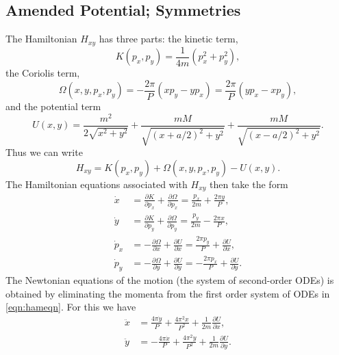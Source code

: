 \documentclass[12pt]{article}
\begin{document}
\subsection{Amended Potential; Symmetries}
The Hamiltonian $H_{xy}$ has three parts: the kinetic term,
\[ K(p_x,p_y) = \frac{1}{4m}\left( p_x^2 + p_y^2\right),\]
the Coriolis term,
\[ \Omega(x,y,p_x,p_y) = - \frac{2\pi}{P}(xp_y - yp_x) = \frac{2\pi}{P}(yp_x - xp_y),\]
and the potential term
\[ U(x,y) = \frac{m^2}{2\sqrt{x^2+y^2}} + \frac{mM}{ \sqrt{ (x + a/2)^2 + y^2}} + \frac{mM}{\sqrt{ (x - a/2)^2 + y^2}}.\]
Thus we can write
\[ H_{xy} = K(p_x,p_y) + \Omega(x,y,p_x,p_y) - U(x,y).\]
The Hamiltonian equations associated with $H_{xy}$ then take the form
\begin{equation}\label{eqn:hameqn}
\begin{aligned} 
\dot x &  = \frac{\partial K}{\partial p_x} + \frac{\partial \Omega}{\partial p_x} = \frac{p_x}{2m} + \frac{2\pi y}{P}, \\
\dot y & = \frac{\partial K}{\partial p_y} + \frac{\partial \Omega}{\partial p_y} = \frac{p_y}{2m} - \frac{2\pi x}{P}, \\
\dot p_x & = -\frac{\partial \Omega}{\partial x} + \frac{\partial U}{\partial x} = \frac{2\pi p_y}{P} + \frac{\partial U}{\partial x}, \\
\dot p_y & = -\frac{\partial \Omega}{\partial y} + \frac{\partial U}{\partial y} = -\frac{2\pi p_x}{P} + \frac{\partial U}{\partial y}.
\end{aligned}
\end{equation}
The Newtonian equations of the motion (the system of second-order ODEs) is obtained by eliminating the momenta from the first order system of ODEs in \eqref{eqn:hameqn}. For this we have
\begin{equation}\label{eqn:secondordersystemA}
\begin{aligned}
\ddot x & = \frac{4\pi\dot y}{P} + \frac{4\pi^2 x}{P^2} + \frac{1}{2m} \frac{\partial U}{\partial x}, \\
\ddot y & = - \frac{4\pi \dot x}{P} + \frac{4\pi^2 y}{P^2} + \frac{1}{2m} \frac{\partial U}{\partial y}.
\end{aligned}
\end{equation}
\end{document}
